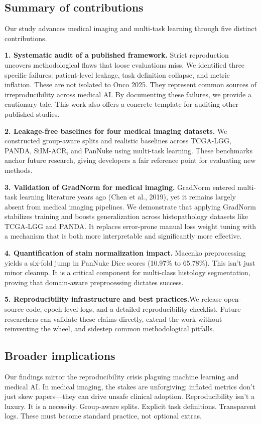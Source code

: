 \documentclass[conference,a4paper]{IEEEtran}
\begin{document}
\subsection{Summary of contributions}
Our study advances medical imaging and multi-task learning through five distinct contributions.

\textbf{1. Systematic audit of a published framework.} Strict reproduction uncovers methodological flaws that loose evaluations miss. We identified three specific failures: patient-level leakage, task definition collapse, and metric inflation. These are not isolated to Onco 2025. They represent common sources of irreproducibility across medical AI. By documenting these failures, we provide a cautionary tale. This work also offers a concrete template for auditing other published studies.

\textbf{2. Leakage-free baselines for four medical imaging datasets.} We constructed group-aware splits and realistic baselines across TCGA-LGG, PANDA, SiIM-ACR, and PanNuke using multi-task learning. These benchmarks anchor future research, giving developers a fair reference point for evaluating new methods.

\textbf{3. Validation of GradNorm for medical imaging.} GradNorm entered multi-task learning literature years ago (Chen et al., 2019), yet it remains largely absent from medical imaging pipelines. We demonstrate that applying GradNorm stabilizes training and boosts generalization across histopathology datasets like TCGA-LGG and PANDA. It replaces error-prone manual loss weight tuning with a mechanism that is both more interpretable and significantly more effective.

\textbf{4. Quantification of stain normalization impact.} Macenko preprocessing yields a six-fold jump in PanNuke Dice scores (10.97\% to 65.78\%). This isn't just minor cleanup. It is a critical component for multi-class histology segmentation, proving that domain-aware preprocessing dictates success.

\textbf{5. Reproducibility infrastructure and best practices.}We release open-source code, epoch-level logs, and a detailed reproducibility checklist. Future researchers can validate these claims directly, extend the work without reinventing the wheel, and sidestep common methodological pitfalls.

\subsection{Broader implications}
Our findings mirror the reproducibility crisis plaguing machine learning and medical AI. In medical imaging, the stakes are unforgiving; inflated metrics don't just skew papers—they can drive unsafe clinical adoption. Reproducibility isn't a luxury. It is a necessity. Group-aware splits. Explicit task definitions. Transparent logs. These must become standard practice, not optional extras.
\end{document}
